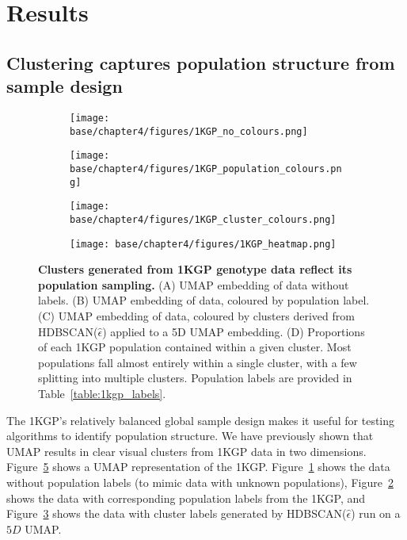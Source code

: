\section{Results}
\subsection{Clustering captures population structure from sample design}

\begin{figure}[ht]
  \centering
  \begin{subfigure}[b]{0.4\linewidth}
    \texttt{[image: base/chapter4/figures/1KGP\_no\_colours.png]}
    \caption{}
    \label{fig:1KGP_no_colours}
  \end{subfigure}
  \begin{subfigure}[b]{0.4\linewidth}
    \texttt{[image: base/chapter4/figures/1KGP\_population\_colours.png]}
    \caption{}
    \label{fig:1KGP_pop_colours}
  \end{subfigure}
    \begin{subfigure}[b]{0.4\linewidth}
    \texttt{[image: base/chapter4/figures/1KGP\_cluster\_colours.png]}
    \caption{}
    \label{fig:1KGP_cluster_colours}
  \end{subfigure}
    \begin{subfigure}[b]{0.4\linewidth}
    \texttt{[image: base/chapter4/figures/1KGP\_heatmap.png]}
    \caption{}
    \label{fig:1KGP_heatmap}
  \end{subfigure}
  \caption[Clusters generated from 1KGP genotype data reflect its population sampling]{\textbf{Clusters generated from 1KGP genotype data reflect its population sampling.} (A) UMAP embedding of data without labels. (B) UMAP embedding of data, coloured by population label. (C) UMAP embedding of data, coloured by clusters derived from HDBSCAN($\hat{\epsilon}$) applied to a 5D UMAP embedding. (D) Proportions of each 1KGP population contained within a given cluster. Most populations fall almost entirely within a single cluster, with a few splitting into multiple clusters. Population labels are provided in Table~\ref{table:1kgp_labels}.}
  \label{fig:1000GP}
\end{figure}

The 1KGP's relatively balanced global sample design makes it useful for testing algorithms to identify population structure. We have previously shown that UMAP results in clear visual clusters from 1KGP data in two dimensions\citep{diaz-papkovich_umap_2019}. Figure~\ref{fig:1000GP} shows a UMAP representation of the 1KGP. Figure~\ref{fig:1KGP_no_colours} shows the data without population labels (to mimic data with unknown populations), Figure~\ref{fig:1KGP_pop_colours} shows the data with corresponding population labels from the 1KGP, and Figure~\ref{fig:1KGP_cluster_colours} shows the data with cluster labels generated by HDBSCAN($\hat{\epsilon}$) run on a $5D$ UMAP.


